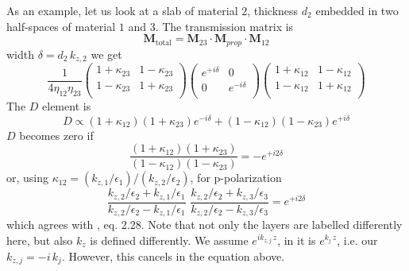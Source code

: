 As an example, let us look at a slab of material $2$, thickness $d_2$ embedded in two half-spaces of material $1$ and $3$. The transmission matrix is
\begin{equation}
\mathbf{M}_\text{total} = \mathbf{M}_{23} \cdot \mathbf{M}_{prop} \cdot \mathbf{M}_{12}
\end{equation}
width $\delta = d_2 \, k_{z,2}$ we get
\begin{equation}
\frac{ 1}{4 \eta_{12} \eta_{23}}
\begin{pmatrix}
1 + \kappa_{23} & 1  -\kappa_{23} \\  1  - \kappa_{23}  & 1 + \kappa_{23} \\
\end{pmatrix} 
%
\begin{pmatrix}
e^{+i \delta } & 0 \\0 & e^{-i \delta } \\
\end{pmatrix}
%
\begin{pmatrix}
1 + \kappa_{12} & 1  -\kappa_{12} \\  1  - \kappa_{12}  & 1 + \kappa_{12} \\
\end{pmatrix} 
\end{equation}
The $D$ element is 
\begin{equation}
D \propto  (1 + \kappa_{12})(1 + \kappa_{23})e^{-i \delta }  +  (1 - \kappa_{12})(1 - \kappa_{23})e^{+i \delta } 
\end{equation}
$D$ becomes zero if 
\begin{equation}
\frac{  (1 + \kappa_{12})(1 + \kappa_{23})   }{ (1 - \kappa_{12})(1 - \kappa_{23})} = - e^{+i 2 \delta } 
\end{equation}
or, using $\kappa_{12} = (k_{z,1} / \epsilon_1) / (k_{z,2} / \epsilon_2)$, for p-polarization
\begin{equation}
\frac{  k_{z,2} / \epsilon_2 + k_{z,1} / \epsilon_1   }{ k_{z,2} / \epsilon_2 - k_{z,1} / \epsilon_1} 
%
\, \,
\frac{  k_{z,2} / \epsilon_2 + k_{z,3} / \epsilon_3   }{ k_{z,2} / \epsilon_2 - k_{z,3} / \epsilon_3} 
%
=  e^{+i 2 \delta } 
\end{equation}
which agrees with \cite{Maier2007}, eq. 2.28. Note that not only the layers are labelled differently here, but also $k_z$ is defined differently. We assume $e^{i k_{z,j} \, z}$, in \cite{Maier2007} it is $e^{ k_j \, z}$, i.e. our $k_{z,j} = -i \, k_j$. However, this cancels in the equation above.

